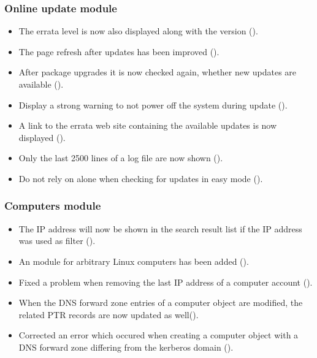 \subsubsection{Online update module}
\begin{itemize}
\item The errata level is now also displayed along with the version ().
\item The page refresh after updates has been improved ().
\item After package upgrades it is now checked again, whether new
  updates are available ().
\item Display a strong warning to not power off the system during update
  ().
\item A link to the errata web site containing the available updates
  is now displayed ().
\item Only the last 2500 lines of a log file are now shown ().
\item Do not rely on  alone when checking
  for updates in easy mode ().
\end{itemize}


\subsubsection{Computers module}
\begin{itemize}

\item The IP address will now be shown in the search result list if
  the IP address was used as filter ().

\item An \ucsUDM{} module for arbitrary Linux computers has been added
  ().

\item Fixed a problem when removing the last IP address of a computer account
  ().

\item When the DNS forward zone entries of a computer object are
  modified, the related PTR records are now updated as well().

\item Corrected an error which occured when creating a computer object
  with a DNS forward zone differing from the kerberos domain
  ().

\end{itemize}

